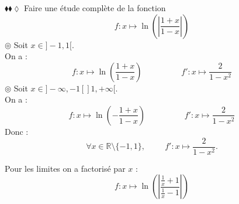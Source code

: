 \documentclass[11pt]{article}
\begin{document}
\begin{exercice}{$\blacklozenge\blacklozenge\lozenge$}{}
    Faire une étude complète de la fonction 
    \begin{equation*}
        f:x\mapsto\ln\left(\left|\frac{1+x}{1-x}\right|\right)
    \end{equation*}
    \tcblower
    $\circledcirc$ Soit $x\in]-1,1[$.\\
    On a :
    \begin{equation*}
        f:x\mapsto\ln\left(\frac{1+x}{1-x}\right) \hspace{2cm} f':x\mapsto\frac{2}{1-x^2}
    \end{equation*}
    $\circledcirc$ Soit $x\in]-\infty,-1[]1,+\infty[$.\\
    On a :
    \begin{equation*}
        f:x\mapsto\ln\left(-\frac{1+x}{1-x}\right) \hspace{2cm} f':x\mapsto\frac{2}{1-x^2}
    \end{equation*}
    Donc :
    \begin{equation*}
        \forall{x\in\mathbb{R}\setminus\{-1,1\}}, \hspace{1cm} f':x\mapsto\frac{2}{1-x^2}.
    \end{equation*}
    \begin{center}
    \end{center}
    Pour les limites on a factorisé par $x$ :
    \begin{equation*}
        f:x\mapsto\ln\left(\left|\frac{\frac{1}{x}+1}{\frac{1}{x}-1}\right|\right)
    \end{equation*}
\end{exercice}
\end{document}
